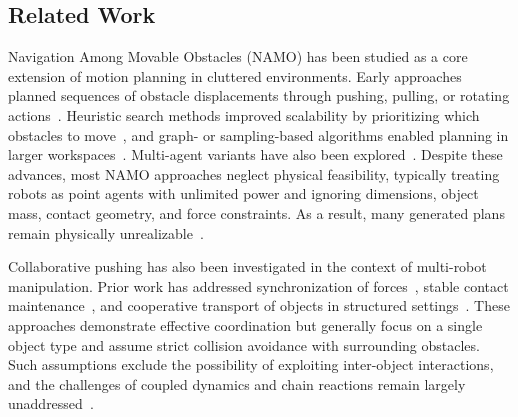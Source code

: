\subsection{Related Work}\label{subsec:intro-related}
Navigation Among Movable Obstacles (NAMO) has been studied as a core
extension of motion planning in cluttered environments. Early approaches
planned sequences of obstacle displacements through pushing, pulling, or
rotating actions~\cite{stilman2005navigation}. Heuristic search methods improved scalability
by prioritizing which obstacles to move~\cite{stilman2007manipulation}, and graph- or
sampling-based algorithms enabled planning in larger workspaces~\cite{yao2024local}.
Multi-agent variants have also been explored~\cite{tang2024collaborative}. Despite these
advances, most NAMO approaches neglect physical feasibility, typically
treating robots as point agents with unlimited power and ignoring
dimensions, object mass, contact geometry, and force constraints. As a
result, many generated plans remain physically unrealizable~\cite{ren2025search}.

Collaborative pushing has also been investigated in the context of
multi-robot manipulation. Prior work has addressed synchronization of
forces~\cite{ni2023progressive}, stable contact maintenance~\cite{liu2025physics}, and cooperative
transport of objects in structured settings~\cite{ni2024physics}. These approaches
demonstrate effective coordination but generally focus on a single object
type and assume strict collision avoidance with surrounding obstacles.
Such assumptions exclude the possibility of exploiting inter-object
interactions, and the challenges of coupled dynamics and chain reactions
remain largely unaddressed~\cite{feng2025learning}.


